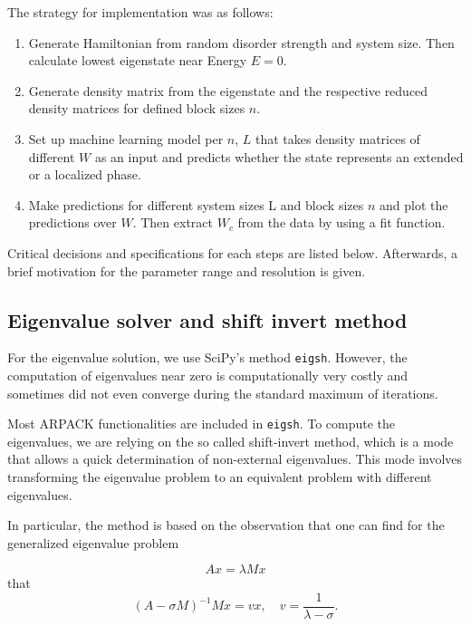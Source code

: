 \documentclass[reprint,amsmath,amssymb,aps,prb]{revtex4-2}
\begin{document}
The strategy for implementation was as follows:

\begin{enumerate}
	\item Generate Hamiltonian from random disorder strength and system size. Then calculate lowest eigenstate near Energy $E = 0$.
	\item Generate density matrix from the eigenstate and the respective reduced density matrices for defined block sizes $n$.
	\item  Set up machine learning model per $n$, $L$ that takes density matrices of different $W$ as an input and predicts whether the state represents an extended or a localized phase.
	\item Make predictions for different system sizes L and block sizes $n$ and plot the predictions over $W$. Then extract $W_c$	from the data by using a fit function.
\end{enumerate}

Critical decisions and specifications for each steps are listed below. Afterwards, a brief motivation for the parameter range and resolution is given.

\subsection{Eigenvalue solver and shift invert method}

For the eigenvalue solution, we use SciPy's method \texttt{eigsh}. However, the computation of eigenvalues near zero is computationally very costly and sometimes did not even converge during the standard maximum of iterations. 

Most ARPACK functionalities are included in \texttt{eigsh}. To compute the eigenvalues, we are relying on the so called shift-invert method, which is a mode that allows a quick determination of non-external eigenvalues. This mode involves transforming the eigenvalue problem to an equivalent problem with different eigenvalues. 

In particular, the method is based on the observation that one can find for the generalized eigenvalue problem

\begin{equation}
Ax=\lambda M x
\end{equation}
that
\begin{equation}
\left(A-\sigma M\right)^{-1}Mx = vx, \quad v=\frac{1}{\lambda-\sigma}.
\end{equation}
\end{document}
